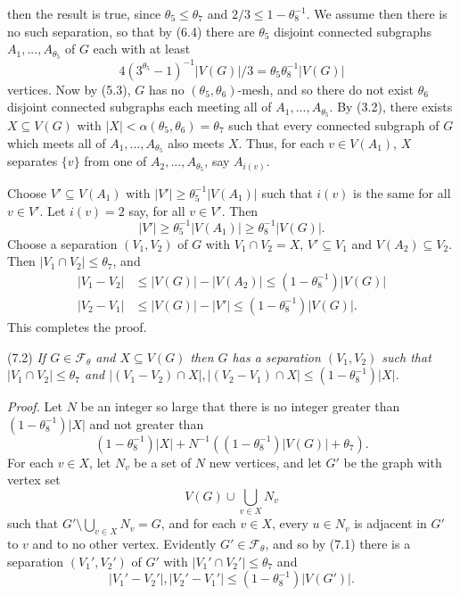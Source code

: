 \noindent then the result is true, since $\theta_5\le \theta_7$ and $2/3\le 1 - \theta_8^{-1}$. We assume then there is no such separation, so that by (6.4) there are $\theta_5$ disjoint connected subgraphs $A_1,..., A_{\theta_5}$ of $G$ each with at least
\begin{equation*}
4(3^{\theta_5} - 1)^{-1}|V(G)|/3 = \theta_5\theta_8^{-1}|V(G)|
\end{equation*}
vertices. Now by (5.3), $G$ has no $(\theta_5, \theta_6)$-mesh, and so there do not exist $\theta_6$ disjoint connected subgraphs each meeting all of $A_1,..., A_{\theta_5}$. By (3.2), there exists $X\subseteq V(G)$ with $|X|<\alpha(\theta_5, \theta_6)=\theta_7$ such that every connected subgraph of $G$ which meets all of $A_1,..., A_{\theta_5}$ also meets $X$. Thus, for each $v\in V(A_1)$, $X$ separates $\{v\}$ from one of $A_2,..., A_{\theta_5}$, say $A_{i(v)}$.

Choose $V'\subseteq V(A_1)$ with $|V'|\ge \theta_5^{-1}|V(A_1)|$ such that $i(v)$ is the same for all $v\in V'$. Let $i(v)=2$ say, for all $v\in V'$. Then
\begin{equation*}
|V'|\ge \theta_5^{-1}|V(A_1)|\ge \theta_8^{-1}|V(G)|.
\end{equation*}
Choose a separation $(V_1, V_2)$ of $G$ with $V_1\cap V_2=X$, $V'\subseteq V_1$ and $V(A_2)\subseteq V_2$. Then $|V_1\cap V_2|\le \theta_7$, and
\begin{align*}
|V_1 - V_2| &\le |V(G)| - |V(A_2)| \le (1 - \theta_8^{-1})|V(G)| \\
|V_2 - V_1| &\le |V(G)| - |V'| \le (1 - \theta_8^{-1})|V(G)|.
\end{align*}
This completes the proof.

\stmt
(7.2) \textit{If $G\in \mathcal{F}_\theta$ and $X\subseteq V(G)$ then $G$ has a separation $(V_1, V_2)$ such that $|V_1\cap V_2|\le \theta_7$ and $|(V_1 - V_2)\cap X|, |(V_2 - V_1)\cap X|\le (1 - \theta_8^{-1})|X|$.}

\textit{Proof.} Let $N$ be an integer so large that there is no integer greater than $(1 - \theta_8^{-1})|X|$ and not greater than
\begin{equation*}
(1 - \theta_8^{-1})|X| + N^{-1}((1 - \theta_8^{-1})|V(G)| + \theta_7).
\end{equation*}
For each $v\in X$, let $N_v$ be a set of $N$ new vertices, and let $G'$ be the graph with vertex set
\begin{equation*}
V(G)\cup \bigcup_{v\in X} N_v
\end{equation*}
such that $G'\setminus \bigcup_{v\in X} N_v = G$, and for each $v\in X$, every $u\in N_v$ is adjacent in $G'$ to $v$ and to no other vertex. Evidently $G'\in \mathcal{F}_\theta$, and so by (7.1) there is a separation $(V_1', V_2')$ of $G'$ with $|V_1'\cap V_2'|\le \theta_7$ and
\begin{equation*}
|V_1' - V_2'|, |V_2' - V_1'| \le (1 - \theta_8^{-1})|V(G')|.
\end{equation*}
